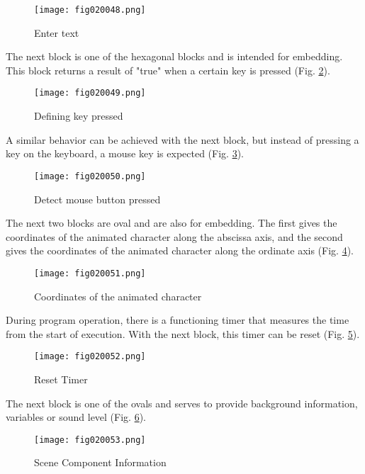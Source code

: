 \begin{figure}[H]
   \centering
   \texttt{[image: fig020048.png]}
   \caption{Enter text}
\label{fig020048}
\end{figure}

The next block is one of the hexagonal blocks and is intended for embedding. This block returns a result of "true" when a certain key is pressed (Fig. \ref{fig020049}).

\begin{figure}[H]
   \centering
   \texttt{[image: fig020049.png]}
   \caption{Defining key pressed}
\label{fig020049}
\end{figure}

A similar behavior can be achieved with the next block, but instead of pressing a key on the keyboard, a mouse key is expected (Fig. \ref{fig020050}).

\begin{figure}[H]
   \centering
   \texttt{[image: fig020050.png]}
   \caption{Detect mouse button pressed}
\label{fig020050}
\end{figure}

The next two blocks are oval and are also for embedding. The first gives the coordinates of the animated character along the abscissa axis, and the second gives the coordinates of the animated character along the ordinate axis (Fig. \ref{fig020051}).

\begin{figure}[H]
   \centering
   \texttt{[image: fig020051.png]}
   \caption{Coordinates of the animated character}
\label{fig020051}
\end{figure}

During program operation, there is a functioning timer that measures the time from the start of execution. With the next block, this timer can be reset (Fig. \ref{fig020052}).

\begin{figure}[H]
   \centering
   \texttt{[image: fig020052.png]}
   \caption{Reset Timer}
\label{fig020052}
\end{figure}

The next block is one of the ovals and serves to provide background information, variables or sound level (Fig. \ref{fig020053}).

\begin{figure}[H]
   \centering
   \texttt{[image: fig020053.png]}
   \caption{Scene Component Information}
\label{fig020053}
\end{figure}


